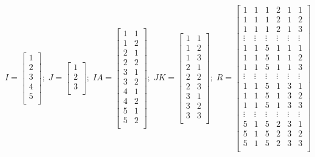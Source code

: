 \documentclass[
  authoryear,
  review,
  1p]{elsarticle}
\begin{document}
\[
I = \begin{bmatrix}
1 \\
2 \\
3 \\
4 \\
5 \\
\end{bmatrix} ; \;
J = \begin{bmatrix}
1 \\
2 \\
3 \\
\end{bmatrix} ; \;
IA = \begin{bmatrix}
1 & 1 \\
1 & 2 \\
2 & 1 \\
2 & 2 \\
3 & 1 \\
3 & 2 \\
4 & 1 \\
4 & 2 \\
5 & 1 \\
5 & 2 \\
\end{bmatrix} ; \;
JK = \begin{bmatrix}
1 & 1 \\
1 & 2 \\
1 & 3 \\
2 & 1 \\
2 & 2 \\
2 & 3 \\
3 & 1 \\
3 & 2 \\
3 & 3 \\
\end{bmatrix} ; \;
R = \begin{bmatrix}
1 & 1 & 1 & 2 & 1 & 1 \\
1 & 1 & 1 & 2 & 1 & 2 \\
1 & 1 & 1 & 2 & 1 & 3 \\
\vdots & \vdots & \vdots & \vdots & \vdots & \vdots\\
1 & 1 & 5 & 1 & 1 & 1 \\
1 & 1 & 5 & 1 & 1 & 2 \\
1 & 1 & 5 & 1 & 1 & 3 \\
\vdots & \vdots & \vdots & \vdots & \vdots & \vdots\\
1 & 1 & 5 & 1 & 3 & 1 \\
1 & 1 & 5 & 1 & 3 & 2 \\
1 & 1 & 5 & 1 & 3 & 3 \\
\vdots & \vdots & \vdots & \vdots & \vdots & \vdots\\
5 & 1 & 5 & 2 & 3 & 1 \\
5 & 1 & 5 & 2 & 3 & 2 \\
5 & 1 & 5 & 2 & 3 & 3 \\
\end{bmatrix}
\]
\end{document}
